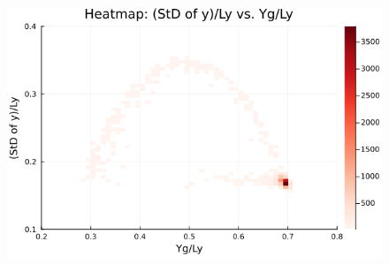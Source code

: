 \begin{figure}[H]
  \centering
  \includegraphics[scale=0.6]{image/RaRtmap10_heat/2023-12-28T12:38:52.986_map_10times_chi1.265_Ay50_rho0.4_T0.43_dT0.04_Rd0.0_Rt0.5_Ra1.877538_g0.0003999718779659611_run4.0e8.png}
  \label{}
\end{figure} 

